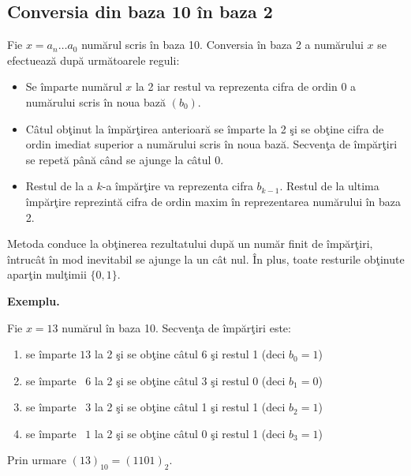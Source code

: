\documentclass{article}
\begin{document}
\doublespacing

\subsection*{Conversia din baza 10 în baza 2}

Fie $x=a_n \ldots a_0$ numărul scris în baza 10. Conversia în baza 2 a numărului $x$ se efectuează după următoarele reguli:

\begin{itemize}[label=$\star$]
	\item Se împarte numărul $x$ la 2 iar restul va reprezenta cifra de ordin 0 a numărului scris în noua bază $(b_0)$.
	\item Câtul obţinut la împărţirea anterioară se împarte la 2 şi se obţine cifra de ordin imediat superior a numărului scris în noua bază. Secvenţa de împărţiri se repetă până când se ajunge la câtul 0.
	\item Restul de la a $k$-a împărţire va reprezenta cifra $b_{k-1}$. Restul de la ultima împărţire reprezintă cifra de ordin maxim în reprezentarea numărului în baza 2.
\end{itemize}

Metoda conduce la obţinerea rezultatului după un număr finit de împărţiri, întrucât în mod inevitabil se ajunge la un cât nul. În plus, toate resturile obţinute aparţin mulţimii $\{0, 1\}$.

\textbf{Exemplu.}

Fie $x=13$ numărul în baza 10. Secvenţa de împărţiri este:

\begin{enumerate}[label={(\arabic*)}]
	\item se împarte $13$ la 2 şi se obţine câtul 6 şi restul 1 (deci $b_0 = 1$)
	\item se împarte $\enspace 6$ la 2 şi se obţine câtul 3 şi restul 0 (deci $b_1 = 0$)
	\item se împarte $\enspace 3$ la 2 şi se obţine câtul 1 şi restul 1 (deci $b_2 = 1$)
	\item se împarte $\enspace 1$ la 2 şi se obţine câtul 0 şi restul 1 (deci $b_3 = 1$)
\end{enumerate}

Prin urmare $(13)_{10} = (1101)_2$.
\end{document}
